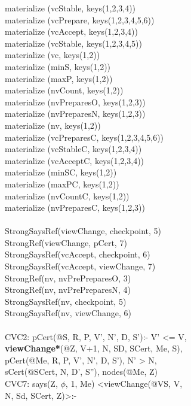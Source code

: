\begin{code}
materialize (vcStable, keys(1,2,3,4))\\
materialize (vcPrepare, keys(1,2,3,4,5,6))\\
materialize (vcAccept, keys(1,2,3,4))\\
materialize (vcStable, keys(1,2,3,4,5))\\
materialize (vc, keys(1,2))\\
materialize (minS, keys(1,2))\\
materialize (maxP, keys(1,2))\\
materialize (nvCount, keys(1,2))\\
materialize (nvPreparesO, keys(1,2,3))\\
materialize (nvPreparesN, keys(1,2,3))\\
materialize (nv, keys(1,2))\\
materialize (vcPreparesC, keys(1,2,3,4,5,6))\\
materialize (vcStableC, keys(1,2,3,4))\\
materialize (vcAcceptC, keys(1,2,3,4))\\
materialize (minSC, keys(1,2))\\
materialize (maxPC, keys(1,2))\\
materialize (nvCountC, keys(1,2))\\
materialize (nvPreparesC, keys(1,2,3))\\
\\
StrongSaysRef(viewChange, checkpoint, 5)\\
StrongRef(viewChange, pCert, 7)\\
StrongSaysRef(vcAccept, checkpoint, 6)\\
StrongSaysRef(vcAccept, viewChange, 7)\\
StrongRef(nv, nvPrePreparesO, 3)\\
StrongRef(nv, nvPrePreparesN, 4)\\
StrongSaysRef(nv, checkpoint, 5)\\
StrongSaysRef(nv, viewChange, 6)\\
\\
CVC2: pCert(@S, R, P, V', N', D, S'):- V' <= V, \\
\> \textbf{viewChange*}(@Z, V+1, N, SD, SCert, Me, S),\\
\> pCert(@Me, R, P, V', N', D, S'), N' > N,\\
\> sCert(@SCert, N, D', S''), nodes(@Me, Z)\\
CVC7: says(Z, $\phi$, 1, Me) <viewChange(@VS, V, \\
\> N, Sd, SCert, Z)>:-\\

\end{code}
